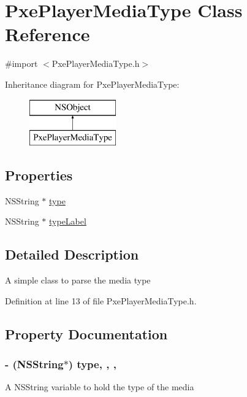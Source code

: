 \hypertarget{interface_pxe_player_media_type}{\section{Pxe\-Player\-Media\-Type Class Reference}
\label{interface_pxe_player_media_type}
}


{\ttfamily \#import $<$Pxe\-Player\-Media\-Type.\-h$>$}

Inheritance diagram for Pxe\-Player\-Media\-Type\-:\begin{figure}[H]
\begin{center}
\leavevmode
\includegraphics[height=2.000000cm]{interface_pxe_player_media_type}
\end{center}
\end{figure}
\subsection*{Properties}
\begin{DoxyCompactItemize}
\item 
N\-S\-String $\ast$ \hyperlink{interface_pxe_player_media_type_a5baff885faa36d468e390b825658d8ad}{type}
\item 
N\-S\-String $\ast$ \hyperlink{interface_pxe_player_media_type_a7ec2c3313fed4481e66a9e43b42b352b}{type\-Label}
\end{DoxyCompactItemize}


\subsection{Detailed Description}
A simple class to parse the media type 

Definition at line 13 of file Pxe\-Player\-Media\-Type.\-h.



\subsection{Property Documentation}
\hypertarget{interface_pxe_player_media_type_a5baff885faa36d468e390b825658d8ad}{
\subsubsection[{type}]{\setlength{\rightskip}{0pt plus 5cm}-\/ (N\-S\-String$\ast$) type\hspace{0.3cm}{\ttfamily [read]}, {\ttfamily [write]}, {\ttfamily [nonatomic]}, {\ttfamily [strong]}}}\label{interface_pxe_player_media_type_a5baff885faa36d468e390b825658d8ad}
A N\-S\-String variable to hold the type of the media 

